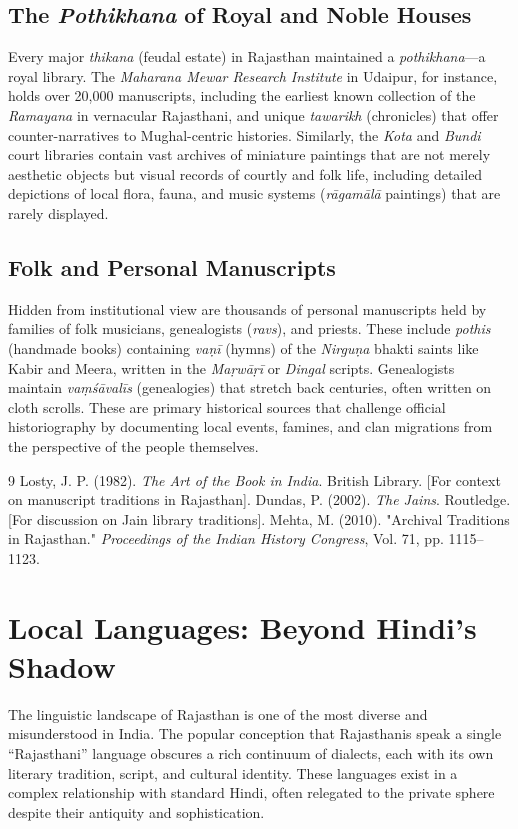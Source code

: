 \documentclass[12pt]{article}
\begin{document}
\subsection{The \textit{Pothikhana} of Royal and Noble Houses}
Every major \textit{thikana} (feudal estate) in Rajasthan maintained a \textit{pothikhana}—a royal library. The \textit{Maharana Mewar Research Institute} in Udaipur, for instance, holds over 20,000 manuscripts, including the earliest known collection of the \textit{Ramayana} in vernacular Rajasthani, and unique \textit{tawarikh} (chronicles) that offer counter-narratives to Mughal-centric histories. Similarly, the \textit{Kota} and \textit{Bundi} court libraries contain vast archives of miniature paintings that are not merely aesthetic objects but visual records of courtly and folk life, including detailed depictions of local flora, fauna, and music systems (\textit{rāgamālā} paintings) that are rarely displayed.

\subsection{Folk and Personal Manuscripts}
Hidden from institutional view are thousands of personal manuscripts held by families of folk musicians, genealogists (\textit{ravs}), and priests. These include \textit{pothis} (handmade books) containing \textit{vaṇī} (hymns) of the \textit{Nirguṇa} bhakti saints like Kabir and Meera, written in the \textit{Maṛwāṛī} or \textit{Dingal} scripts. Genealogists maintain \textit{vaṃśāvalīs} (genealogies) that stretch back centuries, often written on cloth scrolls. These are primary historical sources that challenge official historiography by documenting local events, famines, and clan migrations from the perspective of the people themselves.

\begin{thebibliography}{9}
Losty, J. P. (1982). \textit{The Art of the Book in India}. British Library. [For context on manuscript traditions in Rajasthan].
Dundas, P. (2002). \textit{The Jains}. Routledge. [For discussion on Jain library traditions].
Mehta, M. (2010). "Archival Traditions in Rajasthan." \textit{Proceedings of the Indian History Congress}, Vol. 71, pp. 1115–1123.
\end{thebibliography}

\section{Local Languages: Beyond Hindi’s Shadow}
The linguistic landscape of Rajasthan is one of the most diverse and misunderstood in India. The popular conception that Rajasthanis speak a single “Rajasthani” language obscures a rich continuum of dialects, each with its own literary tradition, script, and cultural identity. These languages exist in a complex relationship with standard Hindi, often relegated to the private sphere despite their antiquity and sophistication.
\end{document}

